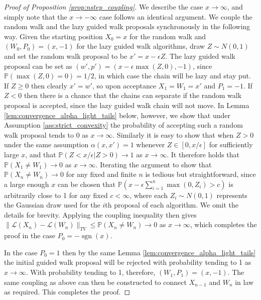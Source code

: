 \documentclass{article}
\theoremstyle{definition}
\theoremstyle{plain}
\begin{document}
\begin{proof}[Proof of Proposition \ref{prop:nstep_coupling}]
We describe the case $x \to \infty$, and simply note that the $x \to -\infty$ case follows an identical argument.  We couple the random walk and the lazy guided walk proposals synchronously in the following way. Given the starting position $X_0 = x$ for the random walk and $(W_0, P_0) = (x,-1)$ for the lazy guided walk algorithms, draw $Z \sim N(0,1)$ and set the random walk proposal to be $x' = x - \epsilon Z$. The lazy guided walk proposal can be set as $(w',p') = (x - \epsilon \max(Z,0), -1)$, since $\mathbb{P}(\max(Z,0) = 0) = 1/2$, in which case the chain will be lazy and stay put. If $Z \geq 0$ then clearly $x' = w'$, so upon acceptance $X_1 = W_1 = x'$ and $P_1 = -1$.  If $Z < 0$ then there is a chance that the chains can separate if the random walk proposal is accepted, since the lazy guided walk chain will not move.  In Lemma \ref{lem:convergence_alpha_light_tails} below, however, we show that under Assumption \ref{ass:strict_convexity} the probability of accepting such a random walk proposal tends to $0$ as $x \to \infty$.  Similarly it is easy to show that when $Z > 0$ under the same assumption $\alpha(x,x') = 1$ whenever $Z \in [0, x/\epsilon]$ for sufficiently large $x$, and that $\mathbb{P}(Z < x/\epsilon | Z > 0) \to 1$ as $x \to \infty$.  It therefore holds that $\mathbb{P}(X_1 \neq W_1) \to 0$ as $x \to \infty$.  Iterating the argument to show that $\mathbb{P}(X_n \neq W_n) \to 0$ for any fixed and finite $n$ is tedious but straightforward, since a large enough $x$ can be chosen that $\mathbb{P}\left( x- \epsilon\sum_{i=1}^n \max(0, Z_i) > c\right)$ is arbitrarily close to 1 for any fixed $c < \infty$, where each $Z_i \sim N(0,1)$ represents the Gaussian draw used for the $i$th proposal of each algorithm. We omit the details for brevity.  Applying the coupling inequality then gives $\|\mathcal{L}(X_n) - \mathcal{L}(W_n)\|_{TV} \leq \mathbb{P}(X_n \neq W_n) \to 0$ as $x \to \infty$, which completes the proof in the case $P_0 = -\operatorname{sgn}(x)$.

In the case $P_0 = 1$ then by the same Lemma \ref{lem:convergence_alpha_light_tails} the initial guided walk proposal will be rejected with probability tending to 1 as $x \to \infty$. With probability tending to 1, therefore, $(W_1,P_1) = (x, -1)$. The same coupling as above can then be constructed to connect $X_{n-1}$ and $W_n$ in law as required.  This completes the proof.
\end{proof}
\end{document}
